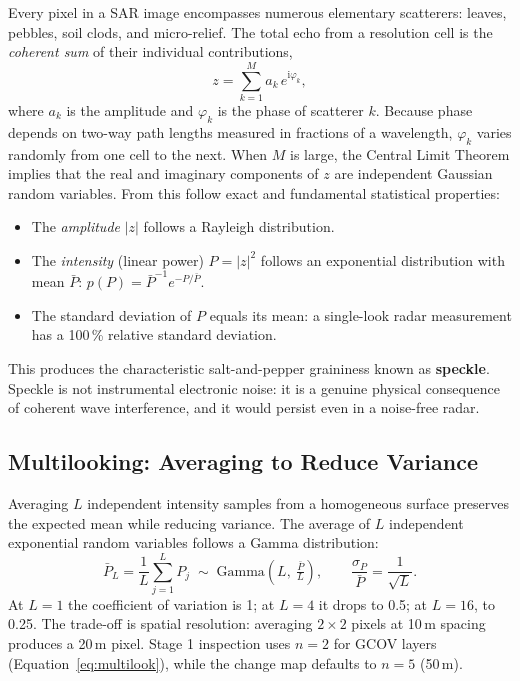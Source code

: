 \documentclass[11pt,a4paper]{article}
\begin{document}
Every pixel in a SAR image encompasses numerous elementary scatterers: leaves, pebbles, soil clods, and micro-relief.
The total echo from a resolution cell is the \emph{coherent sum} of their individual contributions,
\begin{equation}
  z = \sum_{k=1}^{M} a_k\, e^{\mathrm{i}\varphi_k},
  \label{eq:fasor}
\end{equation}
where $a_k$ is the amplitude and $\varphi_k$ is the phase of scatterer $k$. Because phase depends on two-way path lengths measured in fractions of a wavelength, $\varphi_k$ varies randomly from one cell to the next. When $M$ is
large, the Central Limit Theorem implies that the real and imaginary components of $z$ are independent Gaussian random variables. From this follow exact and fundamental statistical properties:
\begin{itemize}
  \item The \emph{amplitude} $|z|$ follows a Rayleigh distribution.
  \item The \emph{intensity} (linear power) $P=|z|^2$ follows an exponential distribution with mean $\bar{P}$:
        $p(P)=\bar{P}^{-1}e^{-P/\bar{P}}$.
  \item The standard deviation of $P$ equals its mean: a single-look radar measurement has a 100\,\% relative standard deviation.
\end{itemize}
This produces the characteristic salt-and-pepper graininess known as \textbf{speckle}. Speckle is not instrumental electronic noise: it is a genuine physical consequence of coherent wave interference, and it would persist even in a noise-free radar.

\subsection{Multilooking: Averaging to Reduce Variance}

Averaging $L$ independent intensity samples from a homogeneous surface preserves the expected mean while reducing variance. The average of $L$ independent exponential random variables follows a Gamma distribution:
\begin{equation}
  \bar P_L = \frac{1}{L}\sum_{j=1}^{L}P_j
  \;\sim\; \mathrm{Gamma}\!\left(L,\ \tfrac{\bar{P}}{L}\right),
  \qquad
  \frac{\sigma_{P}}{\bar{P}} = \frac{1}{\sqrt{L}}.
  \label{eq:gamma-ml}
\end{equation}
At $L=1$ the coefficient of variation is 1; at $L=4$ it drops to 0.5; at $L=16$, to 0.25. The trade-off is spatial resolution: averaging $2\times2$ pixels at 10\,m spacing produces a 20\,m pixel. Stage 1 inspection uses $n=2$ for GCOV layers (Equation~\eqref{eq:multilook}), while the change map defaults to $n=5$ (50\,m).
\end{document}
